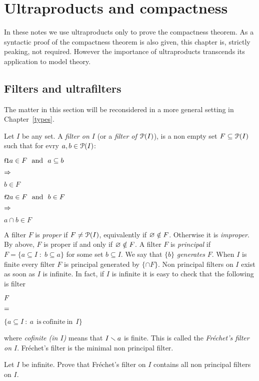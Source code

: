\documentclass[creche.tex]{subfiles}
\begin{document}
\chapter{Ultraproducts and compactness}
\label{ultraprodotti}

\def\medrel#1{\parbox[t]{6ex}{$\displaystyle\hfil #1$}}
\def\ceq#1#2#3{\parbox{25ex}{$\displaystyle #1$}\medrel{#2}$\displaystyle  #3$}

In these notes we use ultraproducts only to prove the compactness theorem. As a syntactic proof of the compactness theorem is also given, this chapter is, strictly peaking, not required. However the importance of ultraproducts transcends its application to model theory.


\section{Filters and ultrafilters}\label{ultrafiltri}

The matter in this section will be reconsidered in a more general setting in Chapter~\ref{types}.

Let $I$ be any set. A \emph{filter on $I$\/} (or a \emph{filter of $\P(I)$}), is a non empty set $F\subseteq \P(I)$ such that for evry $a, b\in \P(I)$:

\ceq{\ssf{f1}\hfill a\in F\ \ \textrm{and}\ \ a\subseteq b}{\IMP}{b\in F}

\ceq{\ssf{f2}\hfill a\in F\ \ \textrm{and}\ \ b\in F}{\IMP}{a\cap b\in F}

A filter $F$ is \emph{proper\/} if $F\neq\P(I)$, equivalently if $\0\notin F$. Otherwise it is \emph{improper}. By  above, $F$ is proper if and only if $\0\notin F$. A filter $F$ is \emph{principal\/} if $F=\{a\subseteq I\; :\; b\subseteq a\}$ for some set $b\subseteq I$. We say that $\{b\}$ \emph{generates\/} $F$. When $I$ is finite every filter $F$ is principal generated by $\{\cap F\}$. Non principal filters on $I$ exist as soon as $I$ is infinite. In fact, if $I$ is infinite it is easy to check that the following is filter

\ceq{\hfill F}{=}{\Big\{a\subseteq I\ :\ a \ \mathrm{\ is\ cofinite\ in\ }\ I\Big\}}

where \emph{cofinite (in $I$)} means that $I\sm a$ is finite. This is called the \emph{Fr\'echet's filter on $I$}. Fr\'echet's filter is the minimal non principal filter.

\begin{exercise}
Let $I$ be infinite. Prove that  Fr\'echet's filter on $I$ contains all non principal filters on $I$.\QED
\end{exercise}
\end{document}
